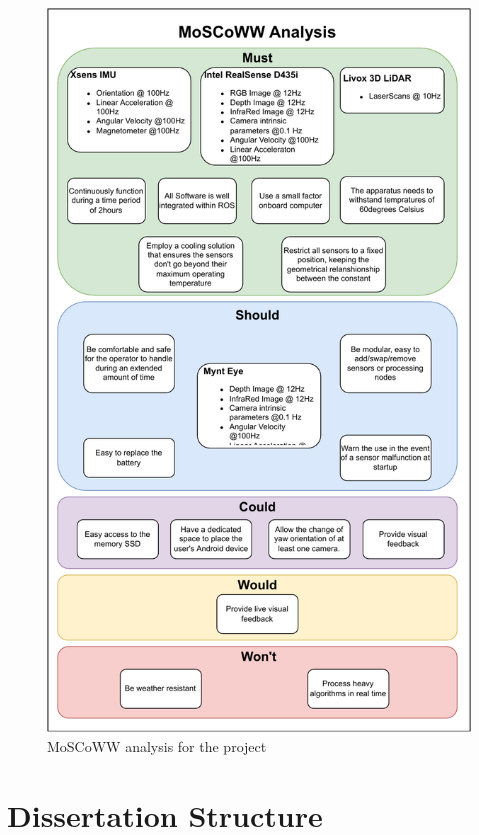 \begin{figure}[H]
    \centering
    \includegraphics[width=0.875\linewidth]{images/introduction/moscoww_analysis.pdf}
    \caption{MoSCoWW analysis for the project}
    \label{fig: moscoww}
\end{figure}

\section{Dissertation Structure}